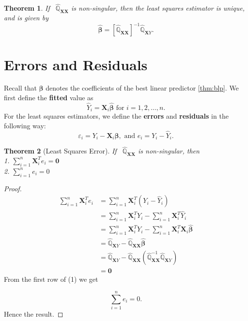 \documentclass[
]{book}
\newtheorem{theorem}{Theorem}[chapter]
\theoremstyle{definition}
\theoremstyle{definition}
\theoremstyle{definition}
\theoremstyle{definition}
\theoremstyle{remark}
\begin{document}
\begin{theorem}
If ~\(\widehat{\mathbb{Q}}_{{\boldsymbol{XX}}}\) is non-singular, then the
least squares estimator is unique, and is given by
\[
\widehat{{\boldsymbol{\beta}}}=\left[\widehat{\mathbb{Q}}_{{\boldsymbol{XX}}}\right]^{-1}
\widehat{\mathbb{Q}}_{{\boldsymbol{X}}Y}.
\]
\end{theorem}

\hypertarget{errors-and-residuals}{%
\section{Errors and Residuals}\label{errors-and-residuals}}

Recall that \({\boldsymbol{\beta}}\) denotes the coefficients of the best linear predictor \ref{thm:blp}. We first define the \textbf{fitted} value as
\[
\widehat{Y}_i={\boldsymbol{X}}_i\widehat{{\boldsymbol{\beta}}}\mbox{ for }
i=1,2,\ldots,n.
\]
For the least squares estimators, we define the \textbf{errors} and \textbf{residuals} in the following way:
\[
\varepsilon_i=Y_i-{\boldsymbol{X}}_i{\boldsymbol{\beta}}, \mbox{ and } 
e_i=Y_i-\widehat{Y}_i.
\]

\begin{theorem}[Least Squares Error]
\protect\hypertarget{thm:olserror}{}\label{thm:olserror}If ~\(\widehat{\mathbb{Q}}_{{\boldsymbol{XX}}}\) is non-singular, then\\
1. \(\sum\limits_{i=1}^n{\boldsymbol{X}}_i^Te_i={\boldsymbol{0}}\)\\
2. \(\sum\limits_{i=1}^ne_i=0\)
\end{theorem}

\begin{proof}
\[
\begin{aligned}
\sum\limits_{i=1}^n{\boldsymbol{X}}_i^Te_i 
&=\sum\limits_{i=1}^n{\boldsymbol{X}}_i^T(Y_i-\widehat{Y}_i) \\
&=\sum\limits_{i=1}^n{\boldsymbol{X}}_i^TY_i-\sum\limits_{i=1}^n{\boldsymbol{X}}_i^T\widehat{Y}_i \\
&=\sum\limits_{i=1}^n{\boldsymbol{X}}_i^TY_i-\sum\limits_{i=1}^n{\boldsymbol{X}}_i^T{\boldsymbol{X}}_i{\boldsymbol{\widehat{\beta}}} \\
&=\widehat{{\mathbb{Q}}}_{{\boldsymbol{X}}Y}-\widehat{{\mathbb{Q}}}_{{\boldsymbol{XX}}}{\boldsymbol{\widehat{\beta}}} \\
&=\widehat{{\mathbb{Q}}}_{{\boldsymbol{X}}Y}-\widehat{{\mathbb{Q}}}_{{\boldsymbol{XX}}}
\left( \widehat{{\mathbb{Q}}}_{{\boldsymbol{XX}}}^{-1} \widehat{{\mathbb{Q}}}_{{\boldsymbol{X}}Y} \right) \\
&={\boldsymbol{0}}
\end{aligned}
\]
From the first row of (1) we get

\[
\sum\limits_{i=1}^n e_i=0.
\]
Hence the result.
\end{proof}
\end{document}
